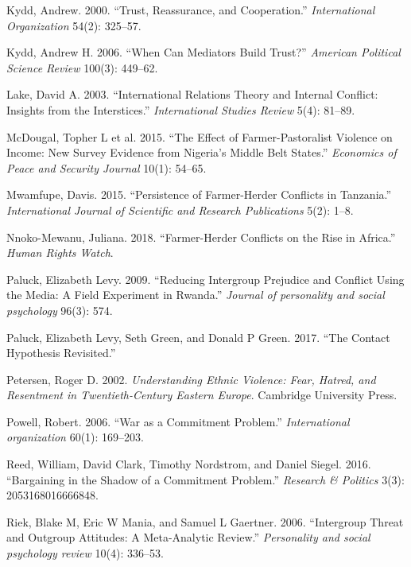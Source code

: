 \documentclass[11pt]{article}
\begin{document}
\leavevmode\hypertarget{ref-kydd2000trust}{}%
Kydd, Andrew. 2000. ``Trust, Reassurance, and Cooperation.''
\emph{International Organization} 54(2): 325--57.

\leavevmode\hypertarget{ref-kydd2006can}{}%
Kydd, Andrew H. 2006. ``When Can Mediators Build Trust?'' \emph{American
Political Science Review} 100(3): 449--62.

\leavevmode\hypertarget{ref-lake2003international}{}%
Lake, David A. 2003. ``International Relations Theory and Internal
Conflict: Insights from the Interstices.'' \emph{International Studies
Review} 5(4): 81--89.

\leavevmode\hypertarget{ref-mcdougal2015effect}{}%
McDougal, Topher L et al. 2015. ``The Effect of Farmer-Pastoralist
Violence on Income: New Survey Evidence from Nigeria's Middle Belt
States.'' \emph{Economics of Peace and Security Journal} 10(1): 54--65.

\leavevmode\hypertarget{ref-mwamfupe2015persistence}{}%
Mwamfupe, Davis. 2015. ``Persistence of Farmer-Herder Conflicts in
Tanzania.'' \emph{International Journal of Scientific and Research
Publications} 5(2): 1--8.

\leavevmode\hypertarget{ref-hrc2018farmer}{}%
Nnoko-Mewanu, Juliana. 2018. ``Farmer-Herder Conflicts on the Rise in
Africa.'' \emph{Human Rights Watch}.

\leavevmode\hypertarget{ref-paluck2009jsp}{}%
Paluck, Elizabeth Levy. 2009. ``Reducing Intergroup Prejudice and
Conflict Using the Media: A Field Experiment in Rwanda.'' \emph{Journal
of personality and social psychology} 96(3): 574.

\leavevmode\hypertarget{ref-paluck2017contact}{}%
Paluck, Elizabeth Levy, Seth Green, and Donald P Green. 2017. ``The
Contact Hypothesis Revisited.''

\leavevmode\hypertarget{ref-petersen2002understanding}{}%
Petersen, Roger D. 2002. \emph{Understanding Ethnic Violence: Fear,
Hatred, and Resentment in Twentieth-Century Eastern Europe}. Cambridge
University Press.

\leavevmode\hypertarget{ref-powell2006war}{}%
Powell, Robert. 2006. ``War as a Commitment Problem.''
\emph{International organization} 60(1): 169--203.

\leavevmode\hypertarget{ref-reed2016bargaining}{}%
Reed, William, David Clark, Timothy Nordstrom, and Daniel Siegel. 2016.
``Bargaining in the Shadow of a Commitment Problem.'' \emph{Research \&
Politics} 3(3): 2053168016666848.

\leavevmode\hypertarget{ref-riek2006threat}{}%
Riek, Blake M, Eric W Mania, and Samuel L Gaertner. 2006. ``Intergroup
Threat and Outgroup Attitudes: A Meta-Analytic Review.''
\emph{Personality and social psychology review} 10(4): 336--53.
\end{document}
